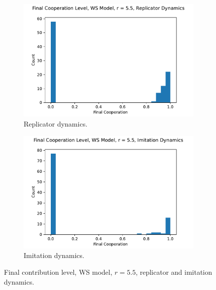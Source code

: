 \FloatBarrier 
\begin{figure}[!h]
  \begin{subfigure}[b]{0.45\textwidth}
    \includegraphics[width=1.1\textwidth]{images/Rep_coop_histo_WS_55.pdf}
    \caption{Replicator dynamics. }
    \label{Rep_WS_55_coop_histo}
  \end{subfigure}
  \hfill
  \begin{subfigure}[b]{0.45\textwidth}
    \includegraphics[width=1.1\textwidth]{images/ID_coop_histo_WS_55.pdf}
    \caption{Imitation dynamics. }
    \label{ID_WS_55_coop_histo}
  \end{subfigure}
  \caption{Final contribution level, WS model, $r = 5.5$, replicator and imitation dynamics. } \label{coop_histo_WS}
\end{figure} 
\FloatBarrier

